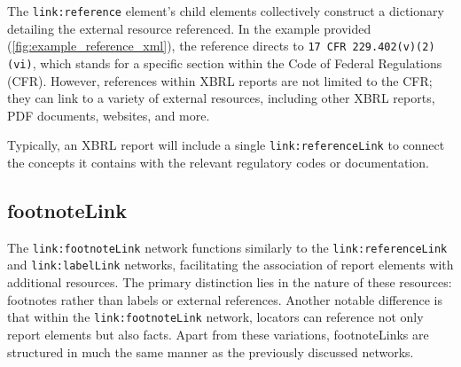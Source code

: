 The \texttt{link:reference} element's child elements collectively construct a dictionary detailing the external resource referenced.  
In the example provided (\ref{fig:example_reference_xml}), the reference directs to \texttt{17 CFR 229.402(v)(2)(vi)}\cite{cfr_229_402_17},  
which stands for a specific section within the Code of Federal Regulations (CFR).  
However, references within XBRL reports are not limited to the CFR; they can link to a variety of external resources, including other XBRL reports, PDF documents, websites, and more.

Typically, an XBRL report will include a single \texttt{link:referenceLink} to connect the concepts it contains with the relevant regulatory codes or documentation.

\subsection{footnoteLink}

The \texttt{link:footnoteLink} network functions similarly to the \texttt{link:referenceLink} and \texttt{link:labelLink} networks, facilitating the association of report elements with additional resources.  
The primary distinction lies in the nature of these resources: footnotes rather than labels or external references.  
Another notable difference is that within the \texttt{link:footnoteLink} network, locators can reference not only report elements but also facts.  
Apart from these variations, footnoteLinks are structured in much the same manner as the previously discussed networks.

\vspace{8cm}